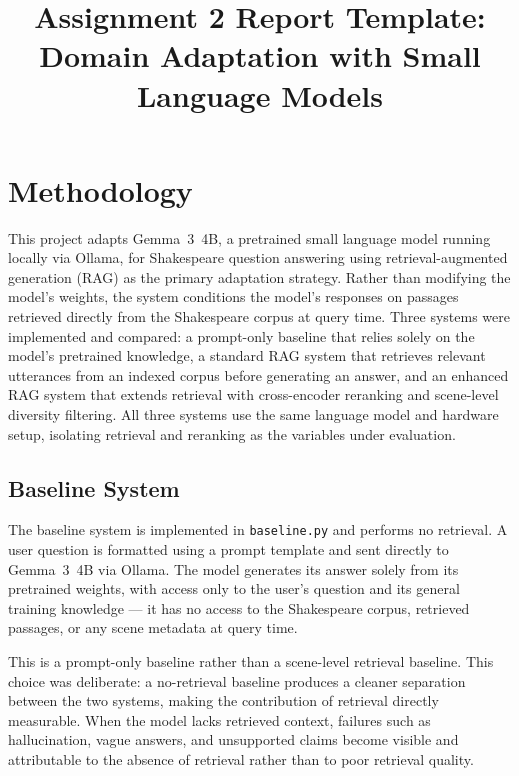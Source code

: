\documentclass[10pt,conference]{IEEEtran}
\title{
Assignment 2 Report Template:\\
Domain Adaptation with Small Language Models
}
\author{
\IEEEauthorblockN{
Group Number: \emph{Insert Group Number}
}
\IEEEauthorblockA{
CSCI433/933 Machine Learning Algorithms and Applications\\
Student Names and Student Numbers: \emph{Insert Details}\\
}
}
\begin{document}
\maketitle

\section{Methodology}
\label{sec:methodology}

This project adapts Gemma~3~4B, a pretrained small language model 
running locally via Ollama, for Shakespeare question answering using 
retrieval-augmented generation (RAG) as the primary adaptation strategy. 
Rather than modifying the model's weights, the system conditions the 
model's responses on passages retrieved directly from the Shakespeare 
corpus at query time. Three systems were implemented and compared: a 
prompt-only baseline that relies solely on the model's pretrained 
knowledge, a standard RAG system that retrieves relevant utterances 
from an indexed corpus before generating an answer, and an enhanced 
RAG system that extends retrieval with cross-encoder reranking and 
scene-level diversity filtering. All three systems use the same language 
model and hardware setup, isolating retrieval and reranking as the 
variables under evaluation.

\subsection{Baseline System}

The baseline system is implemented in \texttt{baseline.py} and performs no retrieval. A user
question is formatted using a prompt template and sent directly to Gemma~3~4B via Ollama.
The model generates its answer solely from its pretrained weights, with access only to the
user's question and its general training knowledge --- it has no access to the Shakespeare
corpus, retrieved passages, or any scene metadata at query time.

This is a prompt-only baseline rather than a scene-level retrieval baseline. This choice was
deliberate: a no-retrieval baseline produces a cleaner separation between the two systems,
making the contribution of retrieval directly measurable. When the model lacks retrieved
context, failures such as hallucination, vague answers, and unsupported claims become visible
and attributable to the absence of retrieval rather than to poor retrieval quality.
\end{document}
